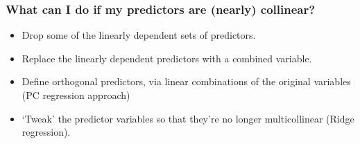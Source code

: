 \documentclass{beamer}
\begin{document}
\begin{frame}
  \frametitle{What can I do if my predictors are (nearly) collinear?}

\begin{itemize}
    \item Drop some of the linearly dependent sets of predictors.
    \item Replace the linearly dependent predictors with a combined variable.
    \item Define orthogonal predictors, via linear combinations of the original variables (PC regression approach)
    \item `Tweak' the predictor variables so that they're no longer multicollinear (Ridge regression).
\end{itemize}

\end{frame}
\end{document}
